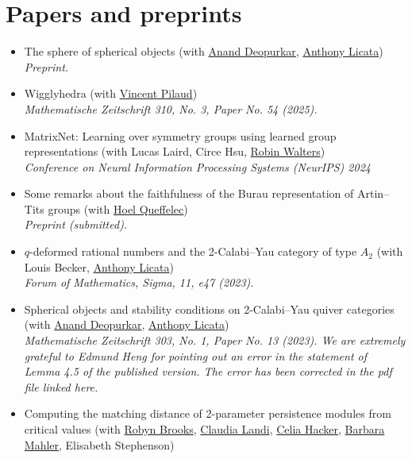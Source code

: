 \documentclass[a4paper]{moderncv}
\begin{document}
\section*{Papers and preprints}
\label{sec:org3a89942}
\begin{itemize}
\item The sphere of spherical objects (with \href{https://deopurkar.github.io}{Anand Deopurkar}, \href{https://maths-people.anu.edu.au/\~licatat/Home.html}{Anthony Licata})\\
\emph{Preprint.}
\item Wigglyhedra (with \href{https://www.lix.polytechnique.fr/\~pilaud/}{Vincent Pilaud})\\
\emph{Mathematische Zeitschrift 310, No. 3, Paper No. 54 (2025).}
\item MatrixNet: Learning over symmetry groups using learned group representations (with Lucas Laird, Circe Hsu, \href{https://www.robinwalters.com/}{Robin Walters})\\
\emph{Conference on Neural Information Processing Systems (NeurIPS) 2024}
\item Some remarks about the faithfulness of the Burau representation of Artin--Tits groups (with \href{https://imag.umontpellier.fr/\~queffelec/}{Hoel Queffelec})\\
\emph{Preprint (submitted).}
\item \(q\)-deformed rational numbers and the 2-Calabi--Yau category of type \(A_{2}\) (with Louis Becker, \href{https://maths-people.anu.edu.au/\~licatat/Home.html}{Anthony Licata})\\
\emph{Forum of Mathematics, Sigma, 11, e47 (2023).}
\item Spherical objects and stability conditions on 2-Calabi--Yau quiver categories (with \href{https://deopurkar.github.io}{Anand Deopurkar}, \href{https://maths-people.anu.edu.au/\~licatat/Home.html}{Anthony Licata})\\
\emph{Mathematische Zeitschrift 303, No. 1, Paper No. 13 (2023). We are extremely grateful to Edmund Heng for pointing out an error in the statement of Lemma 4.5 of the published version. The error has been corrected in the pdf file linked here.}
\item Computing the matching distance of 2-parameter persistence modules from critical values (with \href{https://sites.google.com/view/robynkayebrooks/home}{Robyn Brooks}, \href{http://personale.unimore.it/Rubrica/Dettaglio/clandi}{Claudia Landi}, \href{https://people.epfl.ch/celia.hacker/?lang=en}{Celia Hacker}, \href{https://www.maths.ox.ac.uk/people/barbara.mahler}{Barbara Mahler}, Elisabeth Stephenson)\\

\end{itemize}
\end{document}
